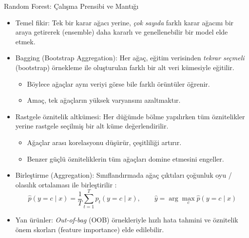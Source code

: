 \documentclass[aspectratio=169]{beamer}
\def\textbf#1{#1}%
\begin{document}
\begin{frame}{Random Forest: Çalışma Prensibi ve Mantığı}
	\begin{itemize}
		\item \textbf{Temel fikir:} Tek bir karar ağacı yerine, \emph{çok sayıda} farklı karar ağacını bir araya getirerek (ensemble) daha kararlı ve genellenebilir bir model elde etmek.
		
		\item \textbf{Bagging (Bootstrap Aggregation):}
		Her ağaç, eğitim verisinden \emph{tekrar seçmeli} (bootstrap) örnekleme ile oluşturulan farklı bir alt veri kümesiyle eğitilir.
		\begin{itemize}
			\item Böylece ağaçlar aynı veriyi görse bile farklı örüntüler öğrenir.
			\item Amaç, tek ağaçların \textbf{yüksek varyansını} azaltmaktır.
		\end{itemize}
		
		\item \textbf{Rastgele öznitelik altkümesi:}
		Her düğümde bölme yapılırken tüm öznitelikler yerine rastgele seçilmiş bir alt küme değerlendirilir.
		\begin{itemize}
			\item Ağaçlar arası korelasyonu düşürür, çeşitliliği artırır.
			\item Benzer güçlü özniteliklerin tüm ağaçları domine etmesini engeller.
		\end{itemize}
		
		\item \textbf{Birleştirme (Aggregation):} Sınıflandırmada ağaç çıktıları çoğunluk oyu / olasılık ortalaması ile birleştirilir \cite{breiman2001-rf}:
		\[
		\hat{p}(y=c\mid x)=\frac{1}{T}\sum_{t=1}^{T} p_t(y=c\mid x), \qquad
		\hat{y}=\arg\max_c \hat{p}(y=c\mid x)
		\]
		
		\item \textbf{Yan ürünler:} \emph{Out-of-bag} (OOB) örnekleriyle hızlı hata tahmini ve öznitelik önem skorları (feature importance) elde edilebilir.
	\end{itemize}
\end{frame}
\end{document}
